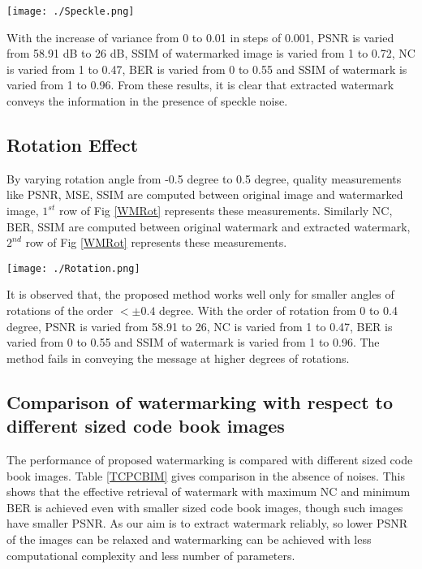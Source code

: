 \begin{figure*}
\centering
\texttt{[image: ./Speckle.png]}
\caption{Speckle Noise}
\label{WMSpeckle}
\end{figure*}  
        
    
    With the increase of variance from 0 to 0.01 in steps of 0.001, PSNR is varied from 58.91 dB to 26 dB, SSIM of watermarked image is varied from 1 to 0.72, NC is varied from 1 to 0.47, BER is varied from 0 to 0.55 and SSIM of watermark is varied from 1 to 0.96. From these results, it is clear that extracted watermark conveys the information in the presence of speckle noise.

 \subsection{Rotation Effect} 
 By varying rotation angle from -0.5 degree to 0.5 degree, quality measurements like PSNR, MSE, SSIM are computed between original image and watermarked image, $1^{st}$ row of Fig \ref{WMRot} represents these measurements. Similarly NC, BER, SSIM are computed between original watermark and extracted watermark, $2^{nd}$ row of Fig \ref{WMRot} represents these measurements.\\
 
\begin{figure*}
\centering
\texttt{[image: ./Rotation.png]}
\caption{Rotation Effect}
\label{WMRot}
\end{figure*} 
 
 It is observed that, the proposed method works well only for smaller angles of rotations of the order $ < \pm { 0.4 } $ degree. With the order of rotation from 0 to 0.4 degree, PSNR is varied from 58.91 to 26, NC is varied from 1 to 0.47, BER is varied from 0 to 0.55 and SSIM of watermark is varied from 1 to 0.96. The method fails in conveying the message at higher degrees of rotations. 
 

\subsection{Comparison of watermarking with respect to different sized code book images } \label{SR}
The performance of proposed watermarking is compared with different sized code book images. Table \ref{TCPCBIM} gives comparison in the absence of noises. This shows that the effective retrieval of watermark with maximum NC and minimum BER is achieved even with smaller sized code book images, though such images have smaller PSNR. As our aim is to extract watermark reliably, so lower PSNR of the images can be relaxed and watermarking can be achieved with less computational complexity and less number of parameters.\\

